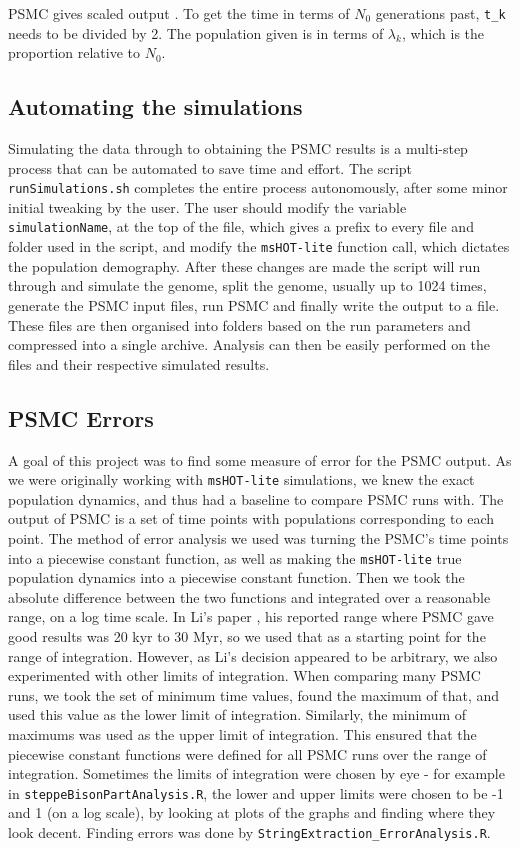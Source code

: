 \documentclass[11pt,a4paper]{article}
\begin{document}
PSMC gives scaled output \cite{li2011inference}. To get the time in terms of $N_0$ generations past, \verb|t_k| needs to be divided by 2. The population given is in terms of $\lambda_k$, which is the proportion relative to $N_0$.

\subsection{Automating the simulations}

Simulating the data through to obtaining the PSMC results is a multi-step process that can be automated to save time and effort. The script \verb|runSimulations.sh| completes the entire process autonomously, after some minor initial tweaking by the user. The user should modify the variable \verb|simulationName|, at the top of the file, which gives a prefix to every file and folder used in the script, and modify the \verb|msHOT-lite| function call, which dictates the population demography. After these changes are made the script will run through and simulate the genome, split the genome, usually up to 1024 times, generate the PSMC input files, run PSMC and finally write the output to a file. These files are then organised into folders based on the run parameters and compressed into a single archive. Analysis can then be easily performed on the files and their respective simulated results.

\subsection{PSMC Errors}
A goal of this project was to find some measure of error for the PSMC output. As we were originally working with \verb|msHOT-lite| simulations, we knew the exact population dynamics, and thus had a baseline to compare PSMC runs with. The output of PSMC is a set of time points with populations corresponding to each point. The method of error analysis we used was turning the PSMC's time points into a piecewise constant function, as well as making the \verb|msHOT-lite| true population dynamics into a piecewise constant function. Then we took the absolute difference between the two functions and integrated over a reasonable range, on a log time scale. In Li's paper \cite{li2011inference}, his reported range where PSMC gave good results was 20 kyr to 30 Myr, so we used that as a starting point for the range of integration. However, as Li's decision appeared to be arbitrary, we also experimented with other limits of integration. When comparing many PSMC runs, we took the set of minimum time values, found the maximum of that, and used this value as the lower limit of integration. Similarly, the minimum of maximums was used as the upper limit of integration. This ensured that the piecewise constant functions were defined for all PSMC runs over the range of integration. Sometimes the limits of integration were chosen by eye - for example in \verb|steppeBisonPartAnalysis.R|, the lower and upper limits were chosen to be -1 and 1 (on a log scale), by looking at plots of the graphs and finding where they look decent. Finding errors was done by \verb|StringExtraction_ErrorAnalysis.R|.
\end{document}
